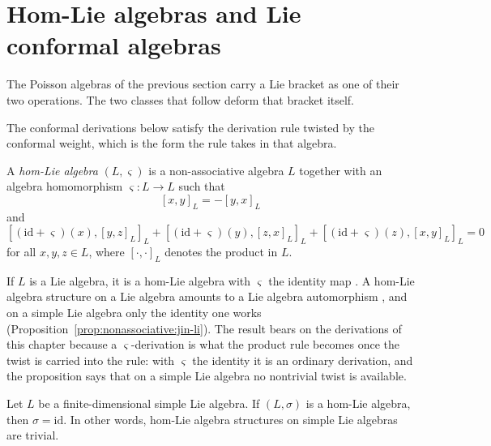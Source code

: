 \section{Hom-Lie algebras and Lie conformal algebras}\label{sec:nonassociative:hom-conformal}

The Poisson algebras of the previous section carry a Lie bracket as one of
their two operations. The two classes that follow deform that bracket
itself. %

The conformal derivations below satisfy the derivation rule twisted by the conformal weight, which is the form the rule takes in that algebra.

\begin{definition}
\label{def:nonassociative:hom-lie}
A \emph{hom-Lie algebra} $(L,\varsigma)$ is a non-associative algebra $L$
together with an algebra homomorphism $\varsigma\colon L\to L$ such that
\[
[x,y]_L=-[y,x]_L
\]
and
\[
[(\mathrm{id}+\varsigma)(x),[y,z]_L]_L
+[(\mathrm{id}+\varsigma)(y),[z,x]_L]_L
+[(\mathrm{id}+\varsigma)(z),[x,y]_L]_L=0
\]
for all $x,y,z\in L$, where $[\cdot,\cdot]_L$ denotes the product in $L$.
\end{definition}

If $L$ is a Lie algebra, it is a hom-Lie algebra with $\varsigma$ the
identity map \cite[p.~18]{HartwigLarssonSilvestrov2006}. A hom-Lie algebra
structure on a Lie algebra amounts to a Lie algebra automorphism
\cite[Section~2, pp.~1399--1400]{JinLi2008HomLie}, and on a simple Lie
algebra only the identity one works (Proposition~\ref{prop:nonassociative:jin-li}).
The result bears on the derivations of this chapter because a
$\varsigma$-derivation is what the product rule becomes once the twist is
carried into the rule: with $\varsigma$ the identity it is an ordinary
derivation, and the proposition says that on a simple Lie algebra no
nontrivial twist is available.

\begin{proposition}
\label{prop:nonassociative:jin-li}
Let $L$ be a finite-dimensional simple Lie algebra. If $(L,\sigma)$ is a
hom-Lie algebra, then $\sigma=\mathrm{id}$. In other words, hom-Lie algebra
structures on simple Lie algebras are trivial.
\end{proposition}

